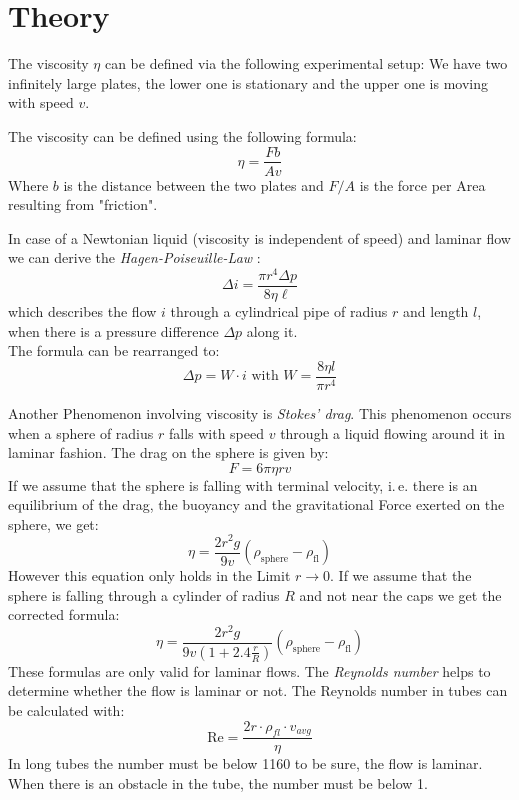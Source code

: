 \section{Theory}

The viscosity $\eta$ can be defined via the following experimental setup: We have two infinitely large plates, the lower one is stationary and the upper one is moving with speed $v$.

The viscosity can be defined using the following formula:
\begin{equation}
    \eta = \frac{F b}{A v} \label{eq:vis}
\end{equation}
Where $b$ is the distance between the two plates and $F/A$ is the force per Area resulting from "friction".

In case of a Newtonian liquid (viscosity is independent of speed) and laminar flow  we can derive the \emph{Hagen-Poiseuille-Law} :
\begin{equation}
   \Delta i = \frac{\pi r^4 \Delta p}{8 \eta \ell} \label{eq:hp}
\end{equation}
which describes the flow $i$ through a cylindrical pipe of radius $r$ and length $l$, when there is a pressure difference $\Delta p$ along it.\\
The formula can be rearranged to:
\begin{equation}
\Delta p = W \cdot i \text{ with } W = \frac{8\eta l}{\pi r^4}
\label{eq:pressure}
\end{equation}


Another Phenomenon involving viscosity is \emph{Stokes' drag}. This phenomenon occurs when a sphere of radius $r$ falls with speed $v$ through a liquid flowing around it in laminar fashion. The drag on the sphere is given by:
\begin{equation}
    F = 6 \pi \eta r v \label{eq:stokes}
\end{equation}
If we assume that the sphere is falling with terminal velocity, i.\,e. there is an equilibrium of the drag, the buoyancy and the gravitational Force exerted on the sphere, we get:
\begin{equation}
    \eta = \frac{2 r^2 g}{9 v}(\rho_\mathrm{sphere} - \rho_\mathrm{fl}) \label{eq:termid}
\end{equation}
However this equation only holds in the Limit $r \to 0$. 
If we assume that the sphere is falling through a cylinder of radius $R$ and not near the caps we get the corrected formula:
\begin{equation}
    \eta = \frac{2 r^2 g}{9 v \left( 1 + 2.4 \frac{r}{R} \right)}(\rho_\mathrm{sphere} - \rho_\mathrm{fl}) \label{eq:term}
\end{equation}
These formulas are only valid for laminar flows. The \emph{Reynolds number} helps to determine whether the flow is laminar or not. The Reynolds number in tubes can be calculated with:
\begin{equation}
\text{Re} = \frac{2r\cdot \rho_ {fl} \cdot v_{avg}}{\eta}
\label{eq:reynold}
\end{equation}
In long tubes the number must be below 1160 to be sure, the flow is laminar. When there is an obstacle in the tube, the number must be below 1.




